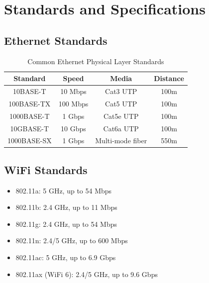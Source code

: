\section{Standards and Specifications}
\subsection*{Ethernet Standards}
\begin{table}[h]
    \centering
    \begin{tabular}{|c|c|c|c|}
        \hline
        \textbf{Standard} & \textbf{Speed} & \textbf{Media} & \textbf{Distance} \\
        \hline
        10BASE-T & 10 Mbps & Cat3 UTP & 100m \\
        100BASE-TX & 100 Mbps & Cat5 UTP & 100m \\
        1000BASE-T & 1 Gbps & Cat5e UTP & 100m \\
        10GBASE-T & 10 Gbps & Cat6a UTP & 100m \\
        1000BASE-SX & 1 Gbps & Multi-mode fiber & 550m \\
        \hline
    \end{tabular}
    \caption{Common Ethernet Physical Layer Standards}\label{tab:ethernet_standards}
\end{table}

\subsection*{WiFi Standards}
\begin{itemize}
    \item 802.11a: 5 GHz, up to 54 Mbps
    \item 802.11b: 2.4 GHz, up to 11 Mbps
    \item 802.11g: 2.4 GHz, up to 54 Mbps
    \item 802.11n: 2.4/5 GHz, up to 600 Mbps
    \item 802.11ac: 5 GHz, up to 6.9 Gbps
    \item 802.11ax (WiFi 6): 2.4/5 GHz, up to 9.6 Gbps
\end{itemize}
